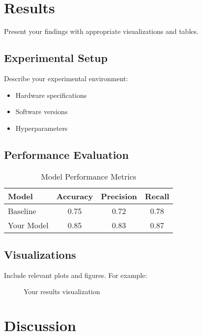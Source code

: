 \documentclass[11pt,a4paper]{article}
\begin{document}
\section{Results}
\label{sec:results}

Present your findings with appropriate visualizations and tables.

\subsection{Experimental Setup}
Describe your experimental environment:
\begin{itemize}
    \item Hardware specifications
    \item Software versions
    \item Hyperparameters
\end{itemize}

\subsection{Performance Evaluation}

\begin{table}[H]
\centering
\caption{Model Performance Metrics}
\label{tab:performance}
\begin{tabular}{|l|c|c|c|}
\hline
\textbf{Model} & \textbf{Accuracy} & \textbf{Precision} & \textbf{Recall} \\
\hline
Baseline & 0.75 & 0.72 & 0.78 \\
Your Model & 0.85 & 0.83 & 0.87 \\
\hline
\end{tabular}
\end{table}

\subsection{Visualizations}

Include relevant plots and figures. For example:

\begin{figure}[H]
\centering
\caption{Your results visualization}
\label{fig:results}
\end{figure}

\section{Discussion}
\label{sec:discussion}
\end{document}
